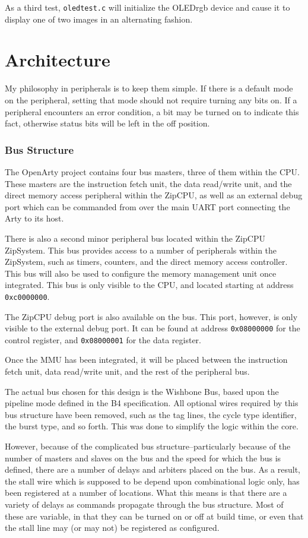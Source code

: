 \documentclass{gqtekspec}
\begin{document}
As a third test, {\tt oledtest.c} will initialize the OLEDrgb device and cause
it to display one of two images in an alternating fashion.

\chapter{Architecture}\label{ch:architecture}
My philosophy in peripherals is to keep them simple.  If there is a default
mode on the peripheral, setting that mode should not require turning any bits
on.  If a peripheral encounters an error condition, a bit may be turned on to
indicate this fact, otherwise status bits will be left in the off position.

\subsection{Bus Structure}
The OpenArty project contains four bus masters, three of them within the CPU.
These masters are the instruction fetch unit, the data read/write unit,
and the direct memory access peripheral within the ZipCPU, as well as an 
external debug port which can be commanded from over the main UART port
connecting the Arty to its host.  

There is also a second minor peripheral bus located within the ZipCPU
ZipSystem.  This bus provides access to a number of peripherals within the
ZipSystem, such as timers, counters, and the direct memory access controller.
This bus will also be used to configure the memory management unit once
integrated.  This bus is only visible to the CPU, and located starting at
address {\tt 0xc0000000}.

The ZipCPU debug port is also available on the bus.  This port, however, is
only visible to the external debug port.  It can be found at address
{\tt 0x08000000} for the control register, and {\tt 0x08000001} for the
data register.

Once the MMU has been integrated, it will be placed between the instruction
fetch unit, data read/write unit, and the rest of the peripheral bus.

The actual bus chosen for this design is the Wishbone Bus, based upon the
pipeline mode defined in the B4 specification.  All optional wires required
by this bus structure have been removed, such as the tag lines, the cycle
type identifier, the burst type, and so forth.  This was done to simplify
the logic within the core.

However, because of the complicated bus structure--particularly because of the
number of masters and slaves on the bus and the speed for which the bus is
defined, there are a number of delays and arbiters placed on the bus.  As a
result, the stall wire which is supposed to be depend upon combinational logic
only, has been registered at a number of locations.  What this means is that
there are a variety of delays as commands propagate through the bus structure.
Most of these are variable, in that they can be turned on or off at build time,
or even that the stall line may (or may not) be registered as configured.
\end{document}
